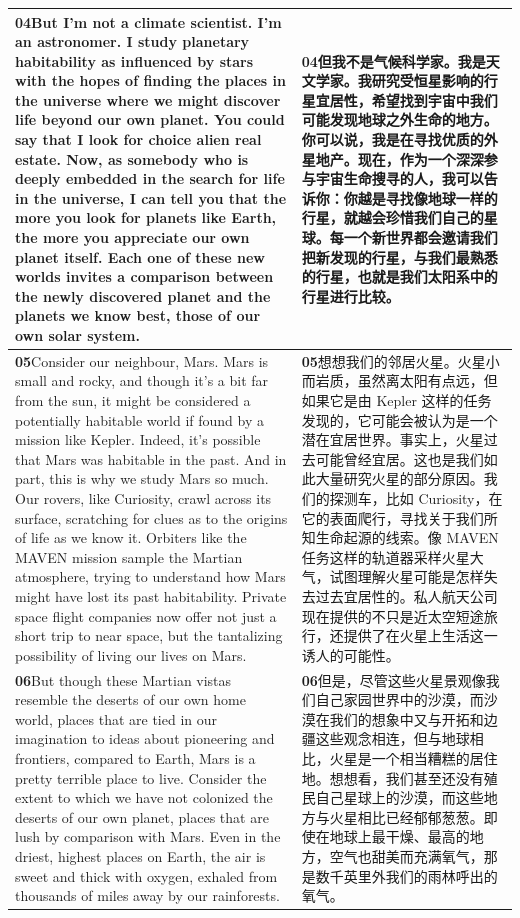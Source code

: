 \documentclass[UTF8,zihao=-4,fontset=fandol]{ctexart}
\newcommand{\TranscriptColumn}{\raggedright\arraybackslash\hyphenpenalty=10000\exhyphenpenalty=10000\sloppy}
\begin{document}
\begin{longtable}{>{\TranscriptColumn}p{} >{\TranscriptColumn}p{}}
\textbf{04}\quad But I'm not a climate scientist. I'm an astronomer. I study planetary habitability as influenced by stars with the hopes of finding the places in the universe where we might discover life beyond our own planet. You could say that I look for choice alien real estate. Now, as somebody who is deeply embedded in the search for life in the universe, I can tell you that the more you look for planets like Earth, the more you appreciate our own planet itself. Each one of these new worlds invites a comparison between the newly discovered planet and the planets we know best, those of our own solar system. & \textbf{04}\quad 但我不是气候科学家。我是天文学家。我研究受恒星影响的行星宜居性，希望找到宇宙中我们可能发现地球之外生命的地方。你可以说，我是在寻找优质的外星地产。现在，作为一个深深参与宇宙生命搜寻的人，我可以告诉你：你越是寻找像地球一样的行星，就越会珍惜我们自己的星球。每一个新世界都会邀请我们把新发现的行星，与我们最熟悉的行星，也就是我们太阳系中的行星进行比较。 \\ \hline
\textbf{05}\quad Consider our neighbour, Mars. Mars is small and rocky, and though it's a bit far from the sun, it might be considered a potentially habitable world if found by a mission like Kepler. Indeed, it's possible that Mars was habitable in the past. And in part, this is why we study Mars so much. Our rovers, like Curiosity, crawl across its surface, scratching for clues as to the origins of life as we know it. Orbiters like the MAVEN mission sample the Martian atmosphere, trying to understand how Mars might have lost its past habitability. Private space flight companies now offer not just a short trip to near space, but the tantalizing possibility of living our lives on Mars. & \textbf{05}\quad 想想我们的邻居火星。火星小而岩质，虽然离太阳有点远，但如果它是由 Kepler 这样的任务发现的，它可能会被认为是一个潜在宜居世界。事实上，火星过去可能曾经宜居。这也是我们如此大量研究火星的部分原因。我们的探测车，比如 Curiosity，在它的表面爬行，寻找关于我们所知生命起源的线索。像 MAVEN 任务这样的轨道器采样火星大气，试图理解火星可能是怎样失去过去宜居性的。私人航天公司现在提供的不只是近太空短途旅行，还提供了在火星上生活这一诱人的可能性。 \\ \hline
\textbf{06}\quad But though these Martian vistas resemble the deserts of our own home world, places that are tied in our imagination to ideas about pioneering and frontiers, compared to Earth, Mars is a pretty terrible place to live. Consider the extent to which we have not colonized the deserts of our own planet, places that are lush by comparison with Mars. Even in the driest, highest places on Earth, the air is sweet and thick with oxygen, exhaled from thousands of miles away by our rainforests. & \textbf{06}\quad 但是，尽管这些火星景观像我们自己家园世界中的沙漠，而沙漠在我们的想象中又与开拓和边疆这些观念相连，但与地球相比，火星是一个相当糟糕的居住地。想想看，我们甚至还没有殖民自己星球上的沙漠，而这些地方与火星相比已经郁郁葱葱。即使在地球上最干燥、最高的地方，空气也甜美而充满氧气，那是数千英里外我们的雨林呼出的氧气。 \\ \hline

\end{longtable}
\end{document}
